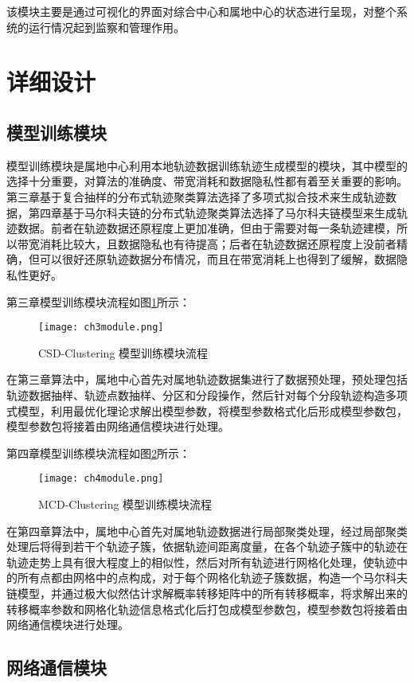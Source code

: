 该模块主要是通过可视化的界面对综合中心和属地中心的状态进行呈现，对整个系统的运行情况起到监察和管理作用。

\section{详细设计}

\subsection{模型训练模块}
模型训练模块是属地中心利用本地轨迹数据训练轨迹生成模型的模块，其中模型的选择十分重要，对算法的准确度、带宽消耗和数据隐私性都有着至关重要的影响。第三章基于复合抽样的分布式轨迹聚类算法选择了多项式拟合技术来生成轨迹数据，第四章基于马尔科夫链的分布式轨迹聚类算法选择了马尔科夫链模型来生成轨迹数据。前者在轨迹数据还原程度上更加准确，但由于需要对每一条轨迹建模，所以带宽消耗比较大，且数据隐私也有待提高；后者在轨迹数据还原程度上没前者精确，但可以很好还原轨迹数据分布情况，而且在带宽消耗上也得到了缓解，数据隐私性更好。

第三章模型训练模块流程如图\ref{ch3module}所示：
\begin{figure}[H]
	\texttt{[image: ch3module.png]}
	\caption{CSD-Clustering 模型训练模块流程}
	\label{ch3module}
\end{figure}

在第三章算法中，属地中心首先对属地轨迹数据集进行了数据预处理，预处理包括轨迹数据抽样、轨迹点数抽样、分区和分段操作，然后针对每个分段轨迹构造多项式模型，利用最优化理论求解出模型参数，将模型参数格式化后形成模型参数包，模型参数包将接着由网络通信模块进行处理。

第四章模型训练模块流程如图\ref{ch4module}所示：
\begin{figure}[H]
	\texttt{[image: ch4module.png]}
	\caption{MCD-Clustering 模型训练模块流程}
	\label{ch4module}
\end{figure}

在第四章算法中，属地中心首先对属地轨迹数据进行局部聚类处理，经过局部聚类处理后将得到若干个轨迹子簇，依据轨迹间距离度量，在各个轨迹子簇中的轨迹在轨迹走势上具有很大程度上的相似性，然后对所有轨迹进行网格化处理，使轨迹中的所有点都由网格中的点构成，对于每个网格化轨迹子簇数据，构造一个马尔科夫链模型，并通过极大似然估计求解概率转移矩阵中的所有转移概率，将求解出来的转移概率参数和网格化轨迹信息格式化后打包成模型参数包，模型参数包将接着由网络通信模块进行处理。

\subsection{网络通信模块}

